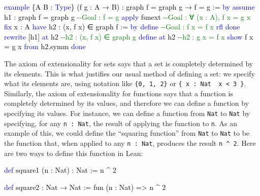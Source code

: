 \documentclass[
  letterpaper,
  DIV=11,
  numbers=noendperiod]{scrreprt}
\newenvironment{Shaded}{\begin{snugshade}}{\end{snugshade}}
\newcommand{\CommentTok}[1]{\textcolor[rgb]{0.37,0.37,0.37}{#1}}
\newcommand{\KeywordTok}[1]{\textcolor[rgb]{0.00,0.23,0.31}{#1}}
\newcommand{\NormalTok}[1]{\textcolor[rgb]{0.00,0.23,0.31}{#1}}
\renewcommand{\NormalTok}[1]{\textcolor[HTML]{000000}{#1}}
\renewcommand{\KeywordTok}[1]{\textcolor[HTML]{0000FF}{#1}}
\renewcommand{\CommentTok}[1]{\textcolor[HTML]{008000}{#1}}
\theoremstyle{remark}
\begin{document}
\begin{Shaded}
\begin{Highlighting}[]
\KeywordTok{example}\NormalTok{ \{A B : }\KeywordTok{Type}\NormalTok{\} (f g : A → B) :}
\NormalTok{    graph f = graph g → f = g := }\KeywordTok{by}
  \KeywordTok{assume}\NormalTok{ h1 : graph f = graph g  }\CommentTok{{-}{-}Goal : f = g}
  \KeywordTok{apply}\NormalTok{ funext                   }\CommentTok{{-}{-}Goal : ∀ (x : A), f x = g x}
  \KeywordTok{fix}\NormalTok{ x : A}
  \KeywordTok{have}\NormalTok{ h2 : (x, f x) ∈ graph f := }\KeywordTok{by}
    \KeywordTok{define}                       \CommentTok{{-}{-}Goal : f x = f x}
    \KeywordTok{rfl}
    \KeywordTok{done}
  \KeywordTok{rewrite}\NormalTok{ [h1] }\KeywordTok{at}\NormalTok{ h2             }\CommentTok{{-}{-}h2 : (x, f x) ∈ graph g}
  \KeywordTok{define} \KeywordTok{at}\NormalTok{ h2                   }\CommentTok{{-}{-}h2 : g x = f x}
  \KeywordTok{show}\NormalTok{ f x = g x }\KeywordTok{from}\NormalTok{ h2.symm}
  \KeywordTok{done}
\end{Highlighting}
\end{Shaded}

The axiom of extensionality for sets says that a set is completely
determined by its elements. This is what justifies our usual method of
defining a set: we specify what its elements are, using notation like
\texttt{\{0,\ 1,\ 2\}} or
\texttt{\{\ x\ :\ Nat\ \textbar{}\ x\ \textless{}\ 3\ \}}. Similarly,
the axiom of extensionality for functions says that a function is
completely determined by its values, and therefore we can define a
function by specifying its values. For instance, we can define a
function from \texttt{Nat} to \texttt{Nat} by specifying, for any
\texttt{n\ :\ Nat}, the result of applying the function to \texttt{n}.
As an example of this, we could define the ``squaring function'' from
\texttt{Nat} to \texttt{Nat} to be the function that, when applied to
any \texttt{n\ :\ Nat}, produces the result \texttt{n\ \^{}\ 2}. Here
are two ways to define this function in Lean:

\begin{Shaded}
\begin{Highlighting}[]
\KeywordTok{def}\NormalTok{ square1 (n : Nat) : Nat := n \^{} 2}

\KeywordTok{def}\NormalTok{ square2 : Nat → Nat := fun (n : Nat) =\textgreater{} n \^{} 2}
\end{Highlighting}
\end{Shaded}
\end{document}
